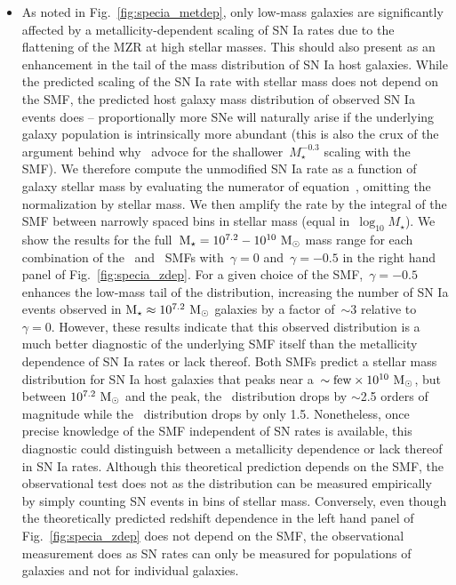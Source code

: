 \documentclass[ms.tex]{subfiles}
\begin{document}
\begin{itemize}
	\item As noted in Fig.~\ref{fig:specia_metdep}, only low-mass galaxies are
	significantly affected by a metallicity-dependent scaling of SN Ia rates
	due to the flattening of the MZR at high stellar masses.
	This should also present as an enhancement in the tail of the mass
	distribution of SN Ia host galaxies.
	While the predicted scaling of the SN Ia rate with stellar mass does not
	depend on the SMF, the predicted host galaxy mass distribution of observed
	SN Ia events does -- proportionally more SNe will naturally arise if the
	underlying galaxy population is intrinsically more abundant (this is also
	the crux of the argument behind why~\citealt{Gandhi2022} advoce for the
	shallower~$M_\star^{-0.3}$ scaling with the~\citealt{Baldry2012} SMF).
	We therefore compute the unmodified SN Ia rate as a function of galaxy
	stellar mass by evaluating the numerator of equation~,
	omitting the normalization by stellar mass.
	We then amplify the rate by the integral of the SMF between narrowly
	spaced bins in stellar mass (equal in~$\log_{10} M_\star$).
	We show the results for the full~$\text{M}_\star = 10^{7.2} - 10^{10}~\text{M}_\odot$ mass
	range for each combination of the~\citet{Bell2003} and~\citet{Baldry2012}
	SMFs with~$\gamma = 0$ and~$\gamma = -0.5$ in the right hand panel of
	Fig.~\ref{fig:specia_zdep}.
	For a given choice of the SMF,~$\gamma = -0.5$ enhances the low-mass tail
	of the distribution, increasing the number of SN Ia events observed in
	$\text{M}_\star \approx 10^{7.2}~\text{M}_\odot$ galaxies by a factor of~$\sim$3 relative
	to~$\gamma = 0$.
	However, these results indicate that this observed distribution is a much
	better diagnostic of the underlying SMF itself than the metallicity
	dependence of SN Ia rates or lack thereof.
	Both SMFs predict a stellar mass distribution for SN Ia host galaxies that
	peaks near a~$\sim \text{few} \times 10^{10}~\text{M}_\odot$, but between
	$10^{7.2}~\text{M}_\odot$ and the peak, the~\citet{Bell2003} distribution drops by
	$\sim$2.5 orders of magnitude while the~\citet{Baldry2012} distribution
	drops by only 1.5.
	Nonetheless, once precise knowledge of the SMF independent of SN rates is
	available, this diagnostic could distinguish between a metallicity
	dependence or lack thereof in SN Ia rates.
	Although this theoretical prediction depends on the SMF, the observational
	test does not as the distribution can be measured empirically by simply
	counting SN events in bins of stellar mass.
	Conversely, even though the theoretically predicted redshift dependence in
	the left hand panel of Fig.~\ref{fig:specia_zdep} does not depend on the
	SMF, the observational measurement does as SN rates can only be measured
	for populations of galaxies and not for individual galaxies.

\end{itemize}
\end{document}
